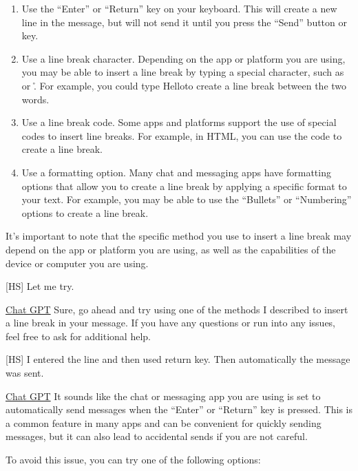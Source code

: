 \documentclass[
]{book}
\providecommand{\tightlist}{%
  \setlength{\itemsep}{0pt}\setlength{\parskip}{0pt}}
\theoremstyle{definition}
\theoremstyle{definition}
\theoremstyle{definition}
\theoremstyle{definition}
\theoremstyle{remark}
\begin{document}
\begin{enumerate}
\def\labelenumi{\arabic{enumi}.}
\tightlist
\item
  Use the ``Enter'' or ``Return'' key on your keyboard. This will create a new line in the message, but will not send it until you press the ``Send'' button or key.
\item
  Use a line break character. Depending on the app or platform you are using, you may be able to insert a line break by typing a special character, such as \n or \r. For example, you could type Hello\nWorld to create a line break between the two words.
\item
  Use a line break code. Some apps and platforms support the use of special codes to insert line breaks. For example, in HTML, you can use the code to create a line break.
\item
  Use a formatting option. Many chat and messaging apps have formatting options that allow you to create a line break by applying a specific format to your text. For example, you may be able to use the ``Bullets'' or ``Numbering'' options to create a line break.
\end{enumerate}

It's important to note that the specific method you use to insert a line break may depend on the app or platform you are using, as well as the capabilities of the device or computer you are using.

{[}HS{]} Let me try.

\protect\hyperlink{chatgpt}{Chat GPT} Sure, go ahead and try using one of the methods I described to insert a line break in your message. If you have any questions or run into any issues, feel free to ask for additional help.

{[}HS{]} I entered the line and then used return key. Then automatically the message was sent.

\protect\hyperlink{chatgpt}{Chat GPT} It sounds like the chat or messaging app you are using is set to automatically send messages when the ``Enter'' or ``Return'' key is pressed. This is a common feature in many apps and can be convenient for quickly sending messages, but it can also lead to accidental sends if you are not careful.

To avoid this issue, you can try one of the following options:
\end{document}
